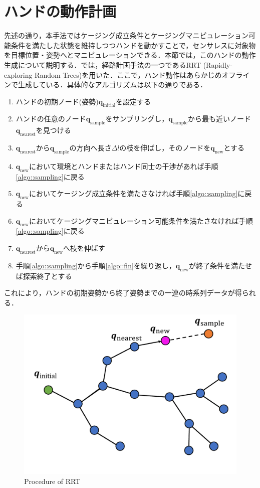 \documentclass[a4paper,twoside,12pt,papersize, dvipdfmx]{iirthesis}
\begin{document}
\section{ハンドの動作計画\cite{komiyama2021}}\label{sec::sicm::planning}
先述の通り，本手法ではケージング成立条件とケージングマニピュレーション可能条件を満たした状態を維持しつつハンドを動かすことで，センサレスに対象物を目標位置・姿勢へとマニピュレーションできる．本節では，このハンドの動作生成について説明する．\cite{komiyama2021}では，経路計画手法の一つであるRRT (Rapidly-exploring Random Trees)\cite{lavalle2001}を用いた．ここで，ハンド動作はあらかじめオフラインで生成している．具体的なアルゴリズムは以下の通りである．
\begin{enumerate}
\item ハンドの初期ノード(姿勢)$\bm{q}_{\mathrm{initial}}$を設定する
\item ハンドの任意のノード$\bm{q}_{\mathrm{sample}}$をサンプリングし，$\bm{q}_{\mathrm{sample}}$から最も近いノード$\bm{q}_{\mathrm{nearest}}$を見つける\label{algo::sampling}
\item $\bm{q}_{\mathrm{nearest}}$から$\bm{q}_{\mathrm{sample}}$の方向へ長さ$\Delta l$の枝を伸ばし，そのノードを$\bm{q}_{\mathrm{new}}$とする
\item $\bm{q}_{\mathrm{new}}$において環境とハンドまたはハンド同士の干渉があれば手順\ref{algo::sampling}に戻る
\item $\bm{q}_{\mathrm{new}}$においてケージング成立条件を満たさなければ手順\ref{algo::sampling}に戻る
\item $\bm{q}_{\mathrm{new}}$においてケージングマニピュレーション可能条件を満たさなければ手順\ref{algo::sampling}に戻る
\item $\bm{q}_{\mathrm{nearest}}$から$\bm{q}_{\mathrm{new}}$へ枝を伸ばす\label{algo::fin}
\item 手順\ref{algo::sampling}から手順\ref{algo::fin}を繰り返し，$\bm{q}_{\mathrm{new}}$が終了条件を満たせば探索終了とする \label{algo::goal}
\end{enumerate}
これにより，ハンドの初期姿勢から終了姿勢までの一連の時系列データが得られる．
\begin{figure}[b]
\centering
\includegraphics[width=0.5\hsize]{fig/Sensorless_ICM/rrtdiagram.pdf}
\caption{Procedure of RRT \cite{komiyama2021}}
\label{fig::sicm::rrt}
\end{figure}
\end{document}
